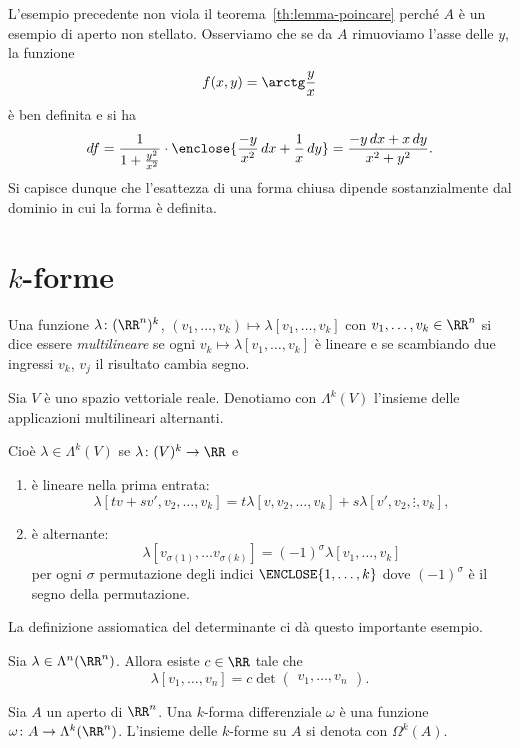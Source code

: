 L'esempio precedente non viola il teorema~\ref{th:lemma-poincare}
perché $A$ è un esempio di aperto non stellato.
Osserviamo che se da $A$ rimuoviamo l'asse delle $y$,
la funzione 
\[
  f(x,y) = \arctg \frac{y}{x}
\]
è ben definita e si ha
\[
df = \frac{1}{1+ \frac{y^2}{x^2}}\cdot 
    \enclose{\frac{-y}{x^2}\, dx + \frac{1}{x}\, dy}
    = \frac{-y\, dx + x\, dy}{x^2+y^2}.
\]
Si capisce dunque che l'esattezza di una forma chiusa dipende sostanzialmente 
dal dominio in cui la forma è definita.

\section{$k$-forme}

Una funzione $\lambda\colon (\RR^n)^k$, 
$(v_1,\dots, v_k)\mapsto \lambda[v_1,\dots, v_k]$
con $v_1,\dots, v_k \in \RR^n$
si dice essere \emph{multilineare} se ogni 
$v_k \mapsto \lambda[v_1,\dots, v_k]$ 
è lineare e se scambiando due ingressi $v_k$, $v_j$ 
il risultato cambia segno.

\begin{definition}
Sia $V$ è uno spazio vettoriale reale.
Denotiamo con $\Lambda^k(V)$
l'insieme delle applicazioni multilineari alternanti.

Cioè $\lambda \in \Lambda^k(V)$ se 
$\lambda\colon (V)^k\to \RR$ e
\begin{enumerate}
\item è lineare nella prima entrata:
\[
    \lambda[tv + s v', v_2, \dots, v_k] 
    = t\lambda[v,v_2,\dots,v_k]
    + s \lambda[v',v_2,\vdots, v_k],
\]
\item è alternante:
\[
    \lambda[v_{\sigma(1)}, \dots v_{\sigma(k)}] = 
    (-1)^\sigma \lambda[v_1,\dots, v_k]
    \]
per ogni $\sigma$ permutazione degli indici $\ENCLOSE{1,\dots,k}$
dove $(-1)^\sigma$ è il segno della permutazione.
\end{enumerate}
\end{definition}

La definizione assiomatica del determinante 
ci dà questo importante esempio.
\begin{example}
Sia $\lambda\in \Lambda^n(\RR^n)$. 
Allora esiste $c\in \RR$ tale che 
\[ 
    \lambda[v_1, \dots, v_n] = c \det \begin{pmatrix}
    v_1, \dots, v_n
    \end{pmatrix}.
\]
\end{example}

\begin{definition}
Sia $A$ un aperto di $\RR^n$.
Una $k$-forma differenziale $\omega$ è una funzione 
$\omega\colon A \to \Lambda^k(\RR^n)$.
L'insieme delle $k$-forme su $A$ si denota con $\Omega^k(A)$.
\end{definition}

